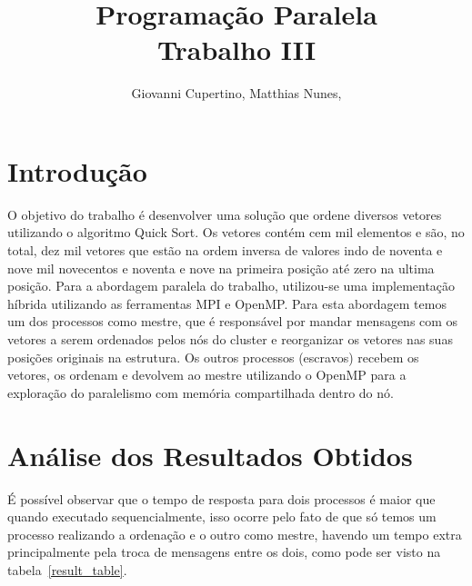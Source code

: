 \documentclass[11pt]{IEEEtran}
\title{Programação Paralela\\ Trabalho III}
\author{Giovanni Cupertino, Matthias Nunes, \IEEEmembership{Usuário pp12820}}
\begin{document}
\maketitle

\section{Introdução}

	O objetivo do trabalho é desenvolver uma solução que ordene diversos vetores
	utilizando o algoritmo Quick Sort.  Os vetores contém cem mil elementos e
	são, no total, dez mil vetores que estão na ordem inversa de valores indo de
	noventa e nove mil novecentos e noventa e nove na primeira posição até zero
	na ultima posição.  Para a abordagem paralela do trabalho, utilizou-se uma
	implementação híbrida utilizando as ferramentas MPI e OpenMP\@. Para esta 
	abordagem temos um dos processos como mestre, que é responsável por mandar 
	mensagens com os vetores a serem ordenados pelos nós do cluster e reorganizar
	os vetores nas suas posições originais na estrutura. Os outros processos 
	(escravos) recebem os vetores, os ordenam e devolvem ao mestre utilizando o 
	OpenMP para a exploração do paralelismo com memória compartilhada dentro do nó.

\section{Análise dos Resultados Obtidos}

	É possível observar que o tempo de resposta para dois
	processos é maior que quando executado sequencialmente, isso ocorre pelo
	fato de que só temos um processo realizando a ordenação e o outro como
	mestre, havendo um tempo extra principalmente pela troca de mensagens entre
	os dois, como pode ser visto na tabela~\ref{result_table}.
\end{document}
